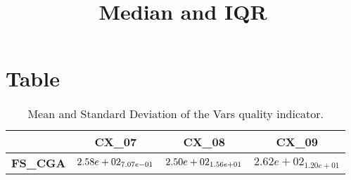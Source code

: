\documentclass{article}
\title{Median and IQR}
\author{}
\begin{document}
\maketitle
\section{Table}
\begin{table}[!htp]
  \caption{Mean and Standard Deviation of the Vars quality indicator.}
  \label{table:Vars}
  \centering
  \begin{scriptsize}
  \begin{tabular}{c|ccc}
      & \textbf{CX\_07} & \textbf{CX\_08} & \textbf{CX\_09} \\\hline
      \textbf{FS_CGA} & $\cellcolor{gray95} 2.58e+02_{7.07e-01} $ & $ \cellcolor{gray25} 2.50e+02_{1.56e+01} $ & $ 2.62e+02_{1.20e+01}$ \\
  \end{tabular}
  \end{scriptsize}
\end{table}
\end{document}
